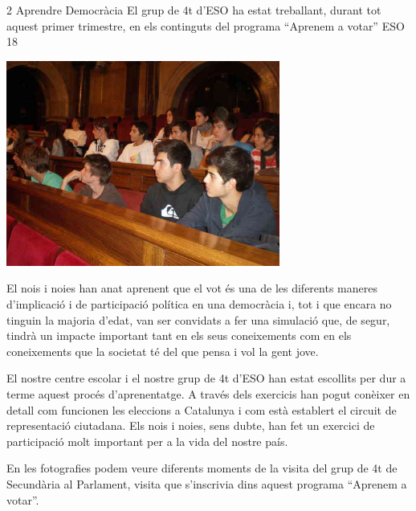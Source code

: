 %
%
\begin{news}
{2} %
{Aprendre Democràcia}
{El grup de 4t d’ESO ha estat treballant, durant tot aquest primer trimestre, en els continguts del programa “Aprenem a votar”}
{ESO}
{18} %

\noindent\includegraphics[width=9cm,keepaspectratio]{eso/img/gen/PA220021_dpi_lowres.JPG}

El nois i noies han anat aprenent que el vot  és una de les diferents maneres d’implicació i de participació política en una democràcia i, tot i que encara no tinguin la majoria d’edat,  van ser convidats a fer una simulació que, de segur, tindrà un impacte important tant en els seus coneixements com en els coneixements que la societat té del que pensa i vol la gent jove.

El nostre centre escolar i el nostre grup de 4t d’ESO han estat escollits per dur a terme aquest procés d’aprenentatge. A través dels exercicis han pogut  conèixer en detall com funcionen les eleccions a Catalunya i com està establert el circuit de representació ciutadana. Els nois i noies, sens dubte,  han fet un exercici de participació molt important per a la vida del nostre país. 

En les fotografies podem veure diferents moments de la visita del grup de 4t de Secundària al Parlament, visita que s’inscrivia dins aquest programa “Aprenem a votar”.

\end{news}
